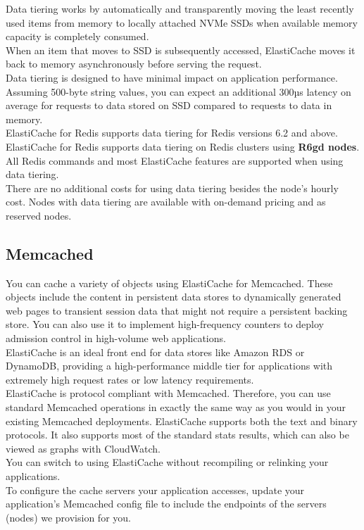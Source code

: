 \documentclass[12pt, letterpaper, twoside]{article}
\begin{document}
Data tiering works by automatically and transparently moving the least recently used items from memory to locally attached 
NVMe SSDs when available memory capacity is completely consumed.\\
When an item that moves to SSD is subsequently accessed, ElastiCache moves it back to memory asynchronously before serving 
the request.\\

Data tiering is designed to have minimal impact on application performance. Assuming 500-byte string values, you can expect 
an additional 300µs latency on average for requests to data stored on SSD compared to requests to data in memory.\\

ElastiCache for Redis supports data tiering for Redis versions 6.2 and above.\\

ElastiCache for Redis supports data tiering on Redis clusters using \textbf{R6gd nodes}.\\

All Redis commands and most ElastiCache features are supported when using data tiering.\\

There are no additional costs for using data tiering besides the node’s hourly cost. Nodes with data tiering are available 
with on-demand pricing and as reserved nodes.\\

\subsection{Memcached}
You can cache a variety of objects using ElastiCache for Memcached. These objects include the content in persistent data 
stores to dynamically generated web pages to transient session data that might not require a persistent backing store. 
You can also use it to implement high-frequency counters to deploy admission control in high-volume web applications.\\

ElastiCache is an ideal front end for data stores like Amazon RDS or DynamoDB, providing a high-performance middle 
tier for applications with extremely high request rates or low latency requirements.\\

ElastiCache is protocol compliant with Memcached. Therefore, you can use standard Memcached operations in exactly 
the same way as you would in your existing Memcached deployments. ElastiCache supports both the text and binary protocols. 
It also supports most of the standard stats results, which can also be viewed as graphs with CloudWatch.\\
You can switch to using ElastiCache without recompiling or relinking your applications.\\
To configure the cache servers your application accesses, update your application's Memcached config file to include the 
endpoints of the servers (nodes) we provision for you.\\
\end{document}
